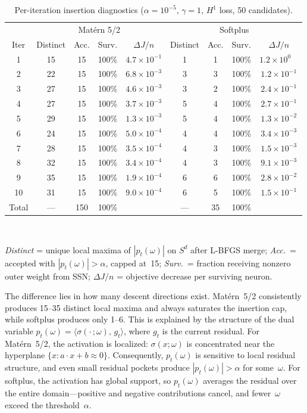 \documentclass[12pt,fleqn]{amsart}
\theoremstyle{definition}
\begin{document}
\begin{table}[H]
\centering
\caption{Per-iteration insertion diagnostics ($\alpha = 10^{-5}$, $\gamma = 1$, $H^1$ loss, 50 candidates).}
\label{tab:insertion_diag}
\begin{tabular}{c|cccc|cccc}
\hline
 & \multicolumn{4}{c|}{Mat\'ern 5/2} & \multicolumn{4}{c}{Softplus} \\
Iter & Distinct & Acc. & Surv. & $\Delta J / n$ & Distinct & Acc. & Surv. & $\Delta J / n$ \\
\hline
1  & 15 & 15 & 100\% & $4.7 \times 10^{-1}$ & 1 & 1 & 100\% & $1.2 \times 10^{0\phantom{-}}$  \\
2  & 22 & 15 & 100\% & $6.8 \times 10^{-3}$ & 3 & 3 & 100\% & $1.2 \times 10^{-1}$ \\
3  & 27 & 15 & 100\% & $4.6 \times 10^{-3}$ & 3 & 2 & 100\% & $2.4 \times 10^{-1}$ \\
4  & 27 & 15 & 100\% & $3.7 \times 10^{-3}$ & 5 & 4 & 100\% & $2.7 \times 10^{-1}$ \\
5  & 29 & 15 & 100\% & $1.3 \times 10^{-3}$ & 5 & 4 & 100\% & $1.3 \times 10^{-2}$ \\
6  & 24 & 15 & 100\% & $5.0 \times 10^{-4}$ & 4 & 4 & 100\% & $3.4 \times 10^{-3}$ \\
7  & 28 & 15 & 100\% & $3.5 \times 10^{-4}$ & 4 & 3 & 100\% & $1.5 \times 10^{-3}$ \\
8  & 32 & 15 & 100\% & $3.4 \times 10^{-4}$ & 4 & 3 & 100\% & $9.1 \times 10^{-3}$ \\
9  & 35 & 15 & 100\% & $1.9 \times 10^{-4}$ & 6 & 6 & 100\% & $2.8 \times 10^{-2}$ \\
10 & 31 & 15 & 100\% & $9.0 \times 10^{-4}$ & 6 & 5 & 100\% & $1.5 \times 10^{-1}$ \\
\hline
Total & --- & 150 & 100\% & & --- & 35 & 100\% & \\
\hline
\end{tabular}
\\[6pt]
\small
\raggedright
\textit{Distinct} = unique local maxima of $|p_t(\omega)|$ on $S^d$ after L-BFGS merge;\;
\textit{Acc.}\ = accepted with $|p_t(\omega)| > \alpha$, capped at~15;\;
\textit{Surv.}\ = fraction receiving nonzero outer weight from SSN;\;
$\Delta J / n$ = objective decrease per surviving neuron.
\end{table}

The difference lies in how many descent directions exist.
Mat\'ern~5/2 consistently produces 15--35 distinct local maxima and always saturates the insertion cap, while softplus produces only 1--6.
This is explained by the structure of the dual variable $p_t(\omega) = \langle \sigma(\cdot\,;\omega),\, g_t \rangle$, where $g_t$ is the current residual.
For Mat\'ern~5/2, the activation is localized: $\sigma(x;\omega)$ is concentrated near the hyperplane $\{x : a \cdot x + b \approx 0\}$.
Consequently, $p_t(\omega)$ is sensitive to local residual structure, and even small residual pockets produce $|p_t(\omega)| > \alpha$ for some~$\omega$.
For softplus, the activation has global support, so $p_t(\omega)$ averages the residual over the entire domain---positive and negative contributions cancel, and fewer~$\omega$ exceed the threshold~$\alpha$.
\end{document}
